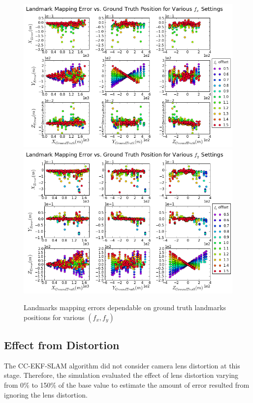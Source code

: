 \begin{figure}[h]
  \centering
  \includegraphics[width=13cm,keepaspectratio=true]{./Figures/SimulationFigures/Figure41.png}
  \includegraphics[width=13cm,keepaspectratio=true]{./Figures/SimulationFigures/Figure42.png}
  \caption{Landmarks mapping errors dependable on ground truth
    landmarks positions for various $(f_x, f_y)$}
  \label{fig:simfig41-42}
\end{figure}
\FloatBarrier

\subsection{Effect from Distortion}
The CC-EKF-SLAM algorithm did not consider camera lens distortion
at this stage. Therefore, the simulation evaluated the effect of
lens distortion varying from 0\% to 150\% of the base value to
estimate the amount of error resulted from ignoring the lens distortion.

